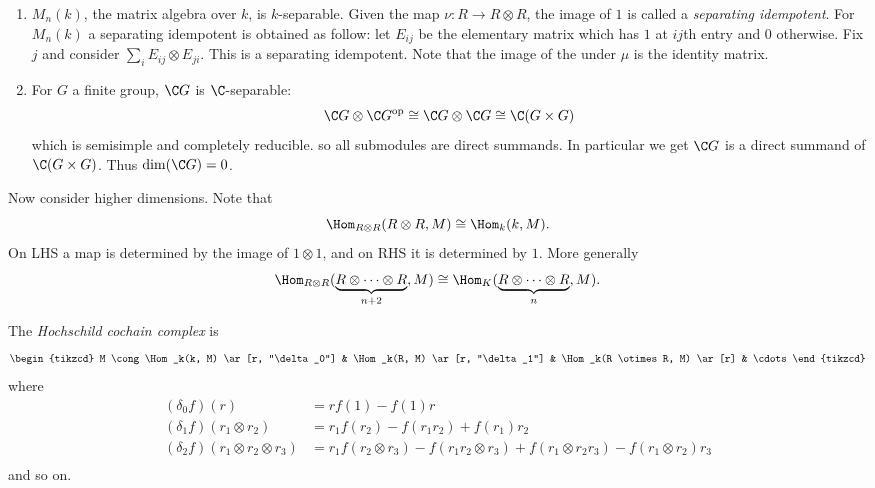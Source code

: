 \documentclass[a4paper]{article}
\begin{document}
\begin{eg}\leavevmode
  \begin{enumerate}
  \item \(M_n(k)\), the matrix algebra over \(k\), is \(k\)-separable. Given the map \(\nu: R \to R \otimes R\), the image of \(1\) is called a \emph{separating idempotent}. For \(M_n(k)\) a separating idempotent is obtained as follow: let \(E_{ij}\) be the elementary matrix which has \(1\) at \(ij\)th entry and \(0\) otherwise. Fix \(j\) and consider \(\sum_i E_{ij} \otimes E_{ji}\). This is a separating idempotent. Note that the image of the under \(\mu\) is the identity matrix.
  \item For \(G\) a finite group, \(\C G\) is \(\C\)-separable:
    \[
      \C G \otimes \C G^{\text{op}}
      \cong \C G \otimes \C G
      \cong \C( G \times G)
    \]
    which is semisimple and completely reducible. so all submodules are direct summands. In particular we get \(\C G\) is a direct summand of \(\C(G \times G)\). Thus \(\dim (\C G) = 0\).
  \end{enumerate}
\end{eg}

Now consider higher dimensions. Note that
\[
  \Hom_{R \otimes R} (R \otimes R, M) \cong \Hom_k (k, M).
\]
On LHS a map is determined by the image of \(1 \otimes 1\), and on RHS it is determined by \(1\). More generally
\[
  \Hom_{R \otimes R} (\underbrace{R \otimes \dots \otimes R}_{n + 2}, M) \cong \Hom_K (\underbrace{R \otimes \dots \otimes R}_n, M).
\]
 
\begin{definition}
  The \emph{Hochschild cochain complex} is
  \[
    \begin{tikzcd}
      M \cong \Hom_k(k, M) \ar[r, "\delta_0"] & \Hom_k(R, M) \ar[r, "\delta_1"] & \Hom_k(R \otimes R, M) \ar[r] & \cdots
    \end{tikzcd}
  \]
  where
  \begin{align*}
    (\delta_0 f)(r) &= rf(1) - f(1) r \\
    (\delta_1 f)(r_1 \otimes r_2) &= r_1 f(r_2) - f(r_1r_2) + f(r_1)r_2 \\
    (\delta_2 f)(r_1 \otimes r_2 \otimes r_3) &= r_1 f(r_2 \otimes r_3) - f(r_1r_2 \otimes r_3) + f(r_1 \otimes r_2r_3) - f(r_1 \otimes r_2) r_3 \\
  \end{align*}
  and so on.
\end{definition}
\end{document}
